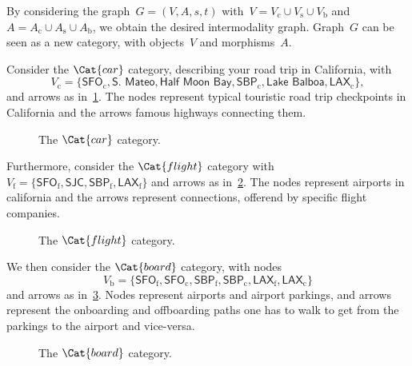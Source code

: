 By considering the graph~$G=(V,A,s,t)$ with~$V=V_\mathrm{c}\cup V_\mathrm{s}\cup V_\mathrm{b}$ and~$A=A_\mathrm{c}\cup A_\mathrm{s}\cup A_\mathrm{b}$, we obtain the desired intermodality graph. Graph~$G$ can be seen as a new category, with objects~$V$ and morphisms~$A$.
\begin{example}
Consider the $\Cat{car}$ category, describing your road trip in California, with
\begin{equation*}
    V_\mathrm{c}=\{\textsf{SFO}_\mathrm{c},\textsf{S. Mateo},\textsf{Half Moon Bay},\textsf{SBP}_\mathrm{c},\textsf{Lake Balboa},\textsf{LAX}_\mathrm{c}\},
\end{equation*}
and arrows as in~\cref{fig:carcat}. The nodes represent typical touristic road trip checkpoints in California and the arrows famous highways connecting them.

\begin{figure}[h!]
\begin{center}
\end{center}
\caption{The $\Cat{car}$ category. \label{fig:carcat}}
\end{figure}

Furthermore, consider the $\Cat{flight}$ category with $V_\mathrm{f}=\{\textsf{SFO}_\mathrm{f}, \textsf{SJC}, \textsf{SBP}_\mathrm{f}, \textsf{LAX}_\mathrm{f}\}$ and arrows as in~\cref{fig:flight}. The nodes represent airports in california and the arrows represent connections, offerend by specific flight companies.

\begin{figure}[h!]
\begin{center}
\end{center}
\caption{The $\Cat{flight}$ category. \label{fig:flight}}
\end{figure}

We then consider the $\Cat{board}$ category, with nodes
\begin{equation*}
    V_\mathrm{b}=\{\textsf{SFO}_\mathrm{f},\textsf{SFO}_\mathrm{c},\textsf{SBP}_\mathrm{f},\textsf{SBP}_\mathrm{c},\textsf{LAX}_\mathrm{f},\textsf{LAX}_\mathrm{c}\}
\end{equation*}
and arrows as in~\cref{fig:boarding}. Nodes represent airports and airport parkings, and arrows represent the onboarding and offboarding paths one has to walk to get from the parkings to the airport and vice-versa.

\begin{figure}[h!]
\begin{center}
\end{center}
\caption{The $\Cat{board}$ category. \label{fig:boarding}}
\end{figure}


\end{example}
